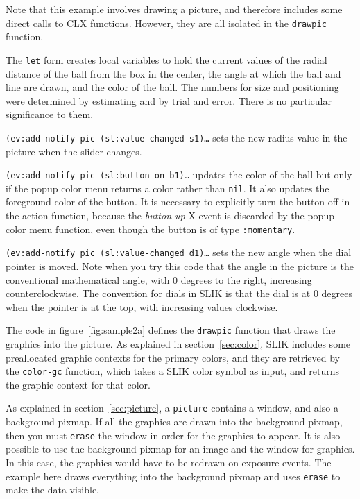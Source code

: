 \documentclass[twoside,openright,11pt]{report}
\newcommand{\tp}[1]{\texttt{#1}}
\begin{document}
Note that this example involves drawing a picture, and therefore
includes some direct calls to CLX functions.  However, they are all
isolated in the \tp{drawpic} function.

The \tp{let} form creates local variables to hold the current values
of the radial distance of the ball from the box in the center, the
angle at which the ball and line are drawn, and the color of the ball.
The numbers for size and positioning were determined by estimating and
by trial and error.  There is no particular significance to them.

\tp{(ev:add-notify pic (sl:value-changed s1)\ldots} sets the new
radius value in the picture when the slider changes.

\tp{(ev:add-notify pic (sl:button-on b1)\ldots} updates the color of
the ball but only if the popup color menu returns a color rather than
\tp{nil}.  It also updates the foreground color of the button.  It is
necessary to explicitly turn the button off in the action function,
because the \emph{button-up} X event is discarded by the popup color
menu function, even though the button is of type \tp{:momentary}.

\tp{(ev:add-notify pic (sl:value-changed d1)\ldots} sets the new angle
when the dial pointer is moved.  Note when you try this code that the
angle in the picture is the conventional mathematical angle, with 0
degrees to the right, increasing counterclockwise.  The convention for
dials in SLIK is that the dial is at 0 degrees when the pointer is at
the top, with increasing values clockwise.

\clearpage %

The code in figure~\ref{fig:sample2a} defines the \tp{drawpic}
function that draws the graphics into the picture.  As explained in
section~\ref{sec:color}, SLIK includes some preallocated graphic
contexts for the primary colors, and they are retrieved by the
\tp{color-gc} function, which takes a SLIK color symbol as input, and
returns the graphic context for that color.

As explained in section~\ref{sec:picture}, a \tp{picture} contains a
window, and also a background pixmap.  If all the graphics are drawn
into the background pixmap, then you must \tp{erase} the window in
order for the graphics to appear.  It is also possible to use the
background pixmap for an image and the window for graphics.  In this
case, the graphics would have to be redrawn on exposure events.  The
example here draws everything into the background pixmap and uses
\tp{erase} to make the data visible.
\end{document}
